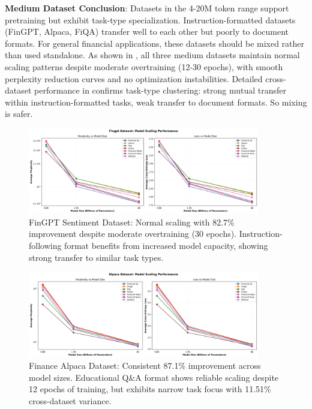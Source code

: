 \textbf{Medium Dataset Conclusion}: Datasets in the 4-20M token range support pretraining but exhibit task-type specialization. Instruction-formatted datasets (FinGPT, Alpaca, FiQA) transfer well to each other but poorly to document formats. For general financial applications, these datasets should be mixed rather than used standalone. As shown in , all three medium datasets maintain normal scaling patterns despite moderate overtraining (12-30 epochs), with smooth perplexity reduction curves and no optimization instabilities. Detailed cross-dataset performance in  confirms task-type clustering: strong mutual transfer within instruction-formatted tasks, weak transfer to document formats. So mixing is safer.

\begin{figure}[h]
\centering
\includegraphics[width=0.9\textwidth]{figures/scaling_fingpt.png}
\caption[FinGPT Sentiment Dataset: Scaling Behavior]{FinGPT Sentiment Dataset: Normal scaling with 82.7\% improvement despite moderate overtraining (30 epochs). Instruction-following format benefits from increased model capacity, showing strong transfer to similar task types.}
\label{fig:scaling_fingpt}
\end{figure}

\begin{figure}[h]
\centering
\includegraphics[width=0.9\textwidth]{figures/scaling_alpaca.png}
\caption[Finance Alpaca Dataset: Scaling Behavior]{Finance Alpaca Dataset: Consistent 87.1\% improvement across model sizes. Educational Q\&A format shows reliable scaling despite 12 epochs of training, but exhibits narrow task focus with 11.51\% cross-dataset variance.}
\label{fig:scaling_alpaca}
\end{figure}

